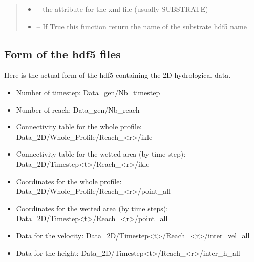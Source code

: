 \documentclass[letterpaper,10pt,english]{sphinxmanual}
\begin{document}
\begin{fulllineitems}
\begin{quote}
\begin{description}
\begin{itemize}
\item {} 
 -- the attribute for the xml file (usually SUBSTRATE)

\item {} 
 -- If True this function return the name of the substrate hdf5 name

\end{itemize}

\end{description}\end{quote}

\end{fulllineitems}



\subsection{Form of the hdf5 files}
\label{\detokenize{index:form-of-the-hdf5-files}}
Here is the actual form of the hdf5 containing the 2D hydrological data.
\begin{itemize}
\item {} 
Number of timestep: Data\_gen/Nb\_timestep

\item {} 
Number of reach: Data\_gen/Nb\_reach

\item {} 
Connectivity table for the whole profile: Data\_2D/Whole\_Profile/Reach\_\textless{}r\textgreater{}/ikle

\item {} 
Connectivity table for the wetted area (by time step): Data\_2D/Timestep\textless{}t\textgreater{}/Reach\_\textless{}r\textgreater{}/ikle

\item {} 
Coordinates for the whole profile: Data\_2D/Whole\_Profile/Reach\_\textless{}r\textgreater{}/point\_all

\item {} 
Coordinates for the wetted area (by time steps): Data\_2D/Timestep\textless{}t\textgreater{}/Reach\_\textless{}r\textgreater{}/point\_all

\item {} 
Data for the velocity: Data\_2D/Timestep\textless{}t\textgreater{}/Reach\_\textless{}r\textgreater{}/inter\_vel\_all

\item {} 
Data for the height:  Data\_2D/Timestep\textless{}t\textgreater{}/Reach\_\textless{}r\textgreater{}/inter\_h\_all

\end{itemize}
\end{document}
